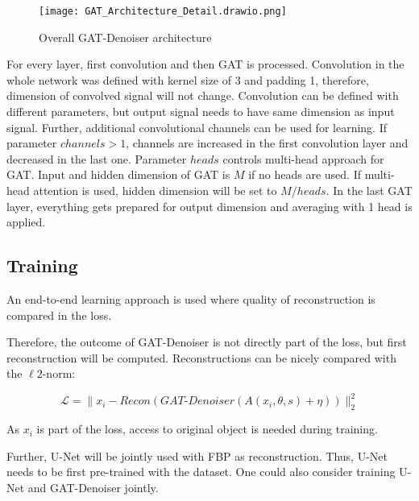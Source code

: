 \begin{figure}[H]
  \centering
  \texttt{[image: GAT\_Architecture\_Detail.drawio.png]}
  \caption{Overall GAT-Denoiser architecture}
  \label{fig:architecture-detailed}
\end{figure}


For every layer, first convolution and then GAT is processed. 
Convolution in the whole network was defined with kernel size of 3 and padding 1,
therefore, dimension of convolved signal will not change. 
Convolution can be defined with different parameters, but output signal needs to have 
same dimension as input signal.
Further, additional convolutional channels can be used for learning.
If parameter $channels > 1$, channels are increased in the first convolution layer 
and decreased in the last one.
Parameter $heads$ controls multi-head approach for GAT. Input and hidden dimension
of GAT is $M$ if no heads are used.
If multi-head attention is used, hidden dimension will be set to $M / heads$.
In the last GAT layer, everything gets prepared for output dimension and 
averaging with 1 head is applied.

\subsection{Training}
\label{sec:contr_training}
An end-to-end learning approach is used where quality of reconstruction is 
compared in the loss.

Therefore, the outcome of GAT-Denoiser is not directly part of the loss, but first reconstruction will be computed.
Reconstructions can be nicely compared with the $\ell2$-norm:

\begin{equation}
  \label{eq:loss_reco}
  \mathcal{L} = \parallel x_i - \textit{Recon} ( \textit{GAT-Denoiser}(A(x_i, \theta, s) + \eta)) \parallel ^2_2
\end{equation}

As $x_i$ is part of the loss, access to original object is needed during training.

Further, U-Net will be jointly used with FBP as reconstruction. 
Thus, U-Net needs to be first pre-trained with the dataset.
One could also consider training U-Net and GAT-Denoiser jointly.
